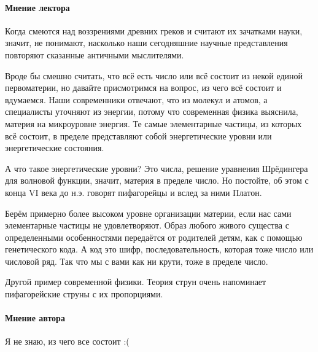\paragraph{Мнение лектора}
Когда смеются над воззрениями древних греков и считают их зачатками науки, значит, не понимают, насколько наши сегодняшние научные представления повторяют сказанные античными мыслителями. 

Вроде бы смешно считать, что всё есть число или всё состоит из некой единой первоматерии, но давайте присмотримся на вопрос, из чего всё состоит и вдумаемся.  Наши современники отвечают, что из молекул и атомов, а специалисты уточняют из энергии, потому что современная физика выяснила, материя на микроуровне энергия. Те самые элементарные частицы, из которых всё состоит, в пределе представляют собой энергетические уровни или энергетические состояния. 

А что такое энергетические уровни? Это числа, решение уравнения Шрёдингера для волновой функции, значит, материя в пределе число. Но постойте, об этом с конца VI века до н.э. говорят пифагорейцы и вслед за ними Платон. 

Берём примерно более высоком уровне организации материи, если нас сами элементарные частицы не удовлетворяют. Образ любого живого существа с определенными особенностями передаётся от родителей детям, как с помощью генетического кода. А код это шифр, последовательность, которая тоже число или числовой ряд. Так что мы с вами как ни крути, тоже в пределе число. 

Другой пример современной физики. Теория струн очень напоминает пифагорейские струны с их пропорциями. 

\paragraph{Мнение автора} Я не знаю, из чего все состоит :(



